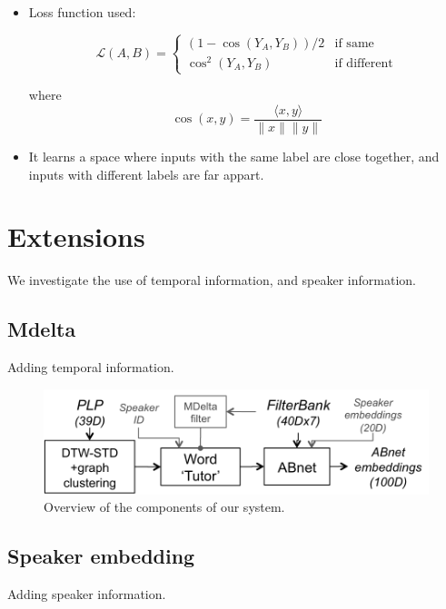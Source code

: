 \documentclass[final]{beamer}
\newcommand{\norm}[1]{\lVert#1\rVert}
\newcommand{\tup}[1]{\langle#1\rangle}
\begin{document}
\begin{frame}[t]
\begin{multicols}{3}
\begin{itemize}
\item Loss function used:

\[
\mathcal{L}(A, B) =
\begin{cases}
(1-\cos(Y_A, Y_B)) / 2 & \text{if same} \\
\cos^2(Y_A, Y_B)       & \text{if different}
\end{cases}
\]

\noindent        
where $$\cos(x, y) = \frac{\tup{x, y}}{\norm{x}\norm{y}}$$

\item It learns a space where inputs with the same label are close together, and inputs with different labels are far appart. 
\end{itemize}


\section{Extensions}

We investigate the use of temporal information, and speaker information.

\subsection{Mdelta}

Adding temporal information.


\begin{figure}[ht!]
  \begin{center}
    \includegraphics[width=0.85\columnwidth]{System2.png}
    \caption{\label{fig:system}Overview of the components of our system.}
  \end{center}
\end{figure}

\subsection{Speaker embedding}

Adding speaker information.



\end{multicols}
\end{frame}
\end{document}
